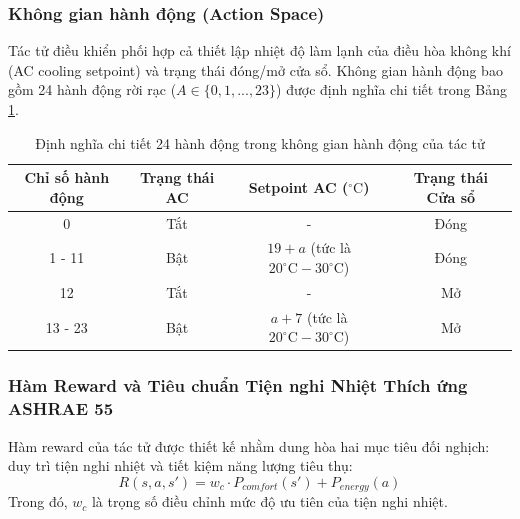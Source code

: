 \documentclass[12pt, a4paper]{article}
\begin{document}
\subsubsection{Không gian hành động (Action Space)}
Tác tử điều khiển phối hợp cả thiết lập nhiệt độ làm lạnh của điều hòa không khí (AC cooling setpoint) và trạng thái đóng/mở cửa sổ. Không gian hành động bao gồm 24 hành động rời rạc ($A \in \{0, 1, ..., 23\}$) được định nghĩa chi tiết trong Bảng \ref{tab:action_definitions}.

\begin{table}[H]
    \centering
    \caption{Định nghĩa chi tiết 24 hành động trong không gian hành động của tác tử}
    \label{tab:action_definitions}
    \vspace{0.2cm}
    \begin{tabular}{cccc}
        \toprule
        \textbf{Chỉ số hành động} & \textbf{Trạng thái AC} & \textbf{Setpoint AC ($^\circ\text{C}$)} & \textbf{Trạng thái Cửa sổ} \\
        \midrule
        0 & Tắt & - & Đóng \\
        1 - 11 & Bật & $19 + a$ (tức là $20^\circ\text{C} - 30^\circ\text{C}$) & Đóng \\
        12 & Tắt & - & Mở \\
        13 - 23 & Bật & $a + 7$ (tức là $20^\circ\text{C} - 30^\circ\text{C}$) & Mở \\
        \bottomrule
    \end{tabular}
\end{table}

\subsubsection{Hàm Reward và Tiêu chuẩn Tiện nghi Nhiệt Thích ứng ASHRAE 55}
Hàm reward của tác tử được thiết kế nhằm dung hòa hai mục tiêu đối nghịch: duy trì tiện nghi nhiệt và tiết kiệm năng lượng tiêu thụ:
\begin{equation}
R(s, a, s') = w_c \cdot P_{comfort}(s') + P_{energy}(a)
\end{equation}
Trong đó, $w_c$ là trọng số điều chỉnh mức độ ưu tiên của tiện nghi nhiệt. 
\end{document}

